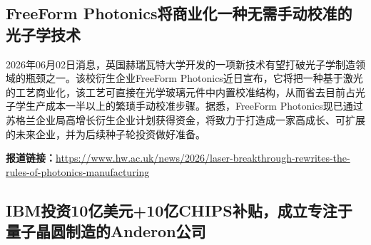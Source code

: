 \documentclass[12pt,a4paper]{ctexart}
\begin{document}
\subsection{ FreeForm Photonics将商业化一种无需手动校准的光子学技术 }

2026年06月02日消息，英国赫瑞瓦特大学开发的一项新技术有望打破光子学制造领域的瓶颈之一。该校衍生企业FreeForm Photonics近日宣布，它将把一种基于激光的工艺商业化，该工艺可直接在光学玻璃元件中内置校准结构，从而省去目前占光子学生产成本一半以上的繁琐手动校准步骤。据悉，FreeForm Photonics现已通过苏格兰企业局高增长衍生企业计划获得资金，将致力于打造成一家高成长、可扩展的未来企业，并为后续种子轮投资做好准备。

\noindent\textbf{报道链接：}\url{https://www.hw.ac.uk/news/2026/laser-breakthrough-rewrites-the-rules-of-photonics-manufacturing}

\subsection{ IBM投资10亿美元+10亿CHIPS补贴，成立专注于量子晶圆制造的Anderon公司 }
\end{document}
